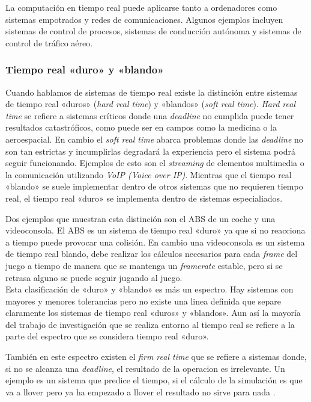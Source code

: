 La computación en tiempo real puede aplicarse tanto a ordenadores como sistemas empotrados y redes de comunicaciones. Algunos ejemplos incluyen sistemas de control de procesos, sistemas de conducción autónoma y sistemas de control de tráfico aéreo.

\subsubsection{Tiempo real «duro» y «blando»}
Cuando hablamos de sistemas de tiempo real existe la distinción entre sistemas de tiempo real «duros» (\textit{hard real time}) y «blandos» (\textit{soft real time}). \textit{Hard real time} se refiere a sistemas críticos donde una \textit{deadline} no cumplida puede tener resultados catastróficos, como puede ser en campos como la medicina o la aeroespacial. En cambio el \textit{soft real time} abarca problemas donde las \textit{deadline} no son tan estrictas y incumplirlas degradará la experiencia pero el sistema podrá seguir funcionando. Ejemplos de esto son el \textit{streaming} de elementos multimedia o la comunicación utilizando \textit{VoIP (Voice over IP)}. Mientras que el tiempo real «blando» se suele implementar dentro de otros sistemas que no requieren tiempo real, el tiempo real «duro» se implementa dentro de sistemas especialiados.

Dos ejemplos que muestran esta distinción son el ABS de un coche y una videoconsola. El ABS es un sistema de tiempo real «duro» ya que si no reacciona a tiempo puede provocar una colisión. En cambio una videoconsola es un sistema de tiempo real blando, debe realizar los cálculos necesarios para cada \textit{frame} del juego a tiempo de manera que se mantenga un \textit{framerate} estable, pero si se retrasa alguno se puede seguir jugando al juego.\\

Esta clasificación de «duro» y «blando» es más un espectro. Hay sistemas con mayores y menores tolerancias pero no existe una linea definida que separe claramente los sistemas de tiempo real «duros» y «blandos». Aun así la mayoría del trabajo de investigación que se realiza entorno al tiempo real se refiere a la parte del espectro que se considera tiempo real «duro».

También en este espectro existen el \textit{firm real time} que se refiere a sistemas donde, si no se alcanza una \textit{deadline}, el resultado de la operacion es irrelevante. Un ejemplo es un sistema que predice el tiempo, si el cálculo de la simulación es que va a llover pero ya ha empezado a llover el resultado no sirve para nada \cite{wang2017rtes}.

